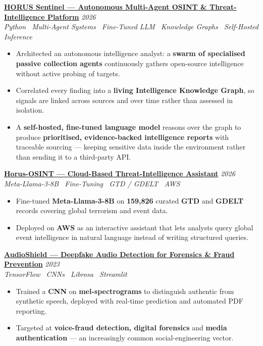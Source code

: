 \documentclass[10pt, a4paper]{article}
\newcommand{\cvproject}[3]{%
  \vspace{2.5pt}%
  {\bfseries\color{navy}#1} \hfill {\color{midgray}\textit{#3}}\\[-1.5pt]%
  {\color{teal}\textit{#2}}%
}
\newenvironment{cvitems}{%
  \begin{itemize}[leftmargin=11pt, itemsep=0.5pt, parsep=0pt, topsep=1pt,
                  label={\textcolor{teal}{$\bullet$}}]
}{%
  \end{itemize}%
}
\begin{document}
\cvproject{\href{https://github.com/MahmoudAlyosify/horus-sentinel}{HORUS Sentinel --- Autonomous Multi-Agent OSINT \& Threat-Intelligence Platform}}
          {Python \textperiodcentered\ Multi-Agent Systems \textperiodcentered\ Fine-Tuned LLM \textperiodcentered\ Knowledge Graphs \textperiodcentered\ Self-Hosted Inference}
          {2026}
\begin{cvitems}
  \item Architected an autonomous intelligence analyst: a \textbf{swarm of specialised passive collection agents} continuously gathers open-source intelligence without active probing of targets.
  \item Correlated every finding into a \textbf{living Intelligence Knowledge Graph}, so signals are linked across sources and over time rather than assessed in isolation.
  \item A \textbf{self-hosted, fine-tuned language model} reasons over the graph to produce \textbf{prioritised, evidence-backed intelligence reports} with traceable sourcing --- keeping sensitive data inside the environment rather than sending it to a third-party API.
\end{cvitems}

\cvproject{\href{https://github.com/MahmoudAlyosify/Horus-OSINT}{Horus-OSINT --- Cloud-Based Threat-Intelligence Assistant}}
          {Meta-Llama-3-8B \textperiodcentered\ Fine-Tuning \textperiodcentered\ GTD / GDELT \textperiodcentered\ AWS}
          {2026}
\begin{cvitems}
  \item Fine-tuned \textbf{Meta-Llama-3-8B} on \textbf{159,826} curated \textbf{GTD} and \textbf{GDELT} records covering global terrorism and event data.
  \item Deployed on \textbf{AWS} as an interactive assistant that lets analysts query global event intelligence in natural language instead of writing structured queries.
\end{cvitems}

\cvproject{\href{https://github.com/MahmoudAlyosify/AudioShield}{AudioShield --- Deepfake Audio Detection for Forensics \& Fraud Prevention}}
          {TensorFlow \textperiodcentered\ CNNs \textperiodcentered\ Librosa \textperiodcentered\ Streamlit}
          {2023}
\begin{cvitems}
  \item Trained a \textbf{CNN} on \textbf{mel-spectrograms} to distinguish authentic from synthetic speech, deployed with real-time prediction and automated PDF reporting.
  \item Targeted at \textbf{voice-fraud detection, digital forensics} and \textbf{media authentication} --- an increasingly common social-engineering vector.
\end{cvitems}
\end{document}
